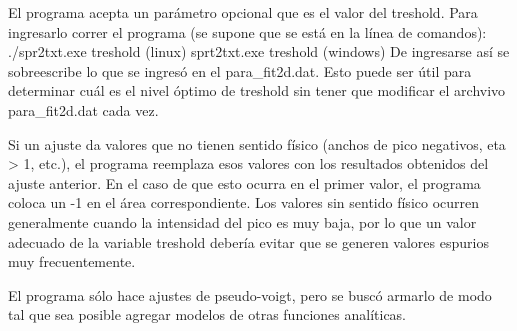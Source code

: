 El programa acepta un parámetro opcional que es el valor del treshold. Para ingresarlo correr el programa (se supone que se está en la línea de comandos):
./spr2txt.exe treshold (linux)
sprt2txt.exe treshold (windows)
De ingresarse así se sobreescribe lo que se ingresó en el para_fit2d.dat. Esto puede ser útil para determinar cuál es el nivel óptimo de treshold sin tener que modificar el archvivo para_fit2d.dat cada vez.

Si un ajuste da valores que no tienen sentido físico (anchos de pico negativos, eta > 1, etc.), el programa reemplaza esos valores con los resultados obtenidos del ajuste anterior. En el caso de que esto ocurra en el primer valor, el programa coloca un -1 en el área correspondiente.
Los valores sin sentido físico ocurren generalmente cuando la intensidad del pico es muy baja, por lo que un valor adecuado de la variable treshold debería evitar que se generen valores espurios muy frecuentemente.

El programa sólo hace ajustes de pseudo-voigt, pero se buscó armarlo de modo tal que sea posible agregar modelos de otras funciones analíticas.
